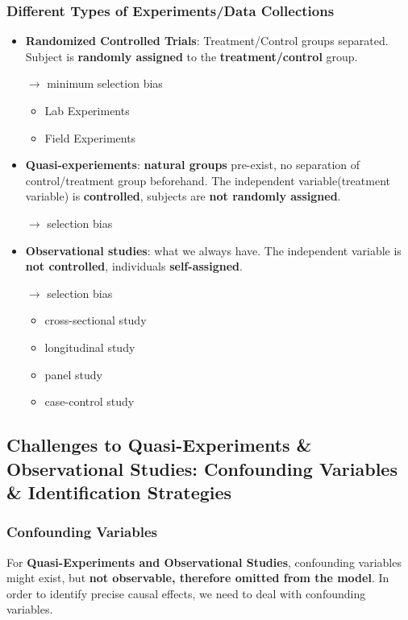 \subsubsection{Different Types of Experiments/Data Collections}
\begin{itemize}
	\item \textbf{Randomized Controlled Trials}: Treatment/Control groups separated. Subject is \textbf{randomly assigned} to the \textbf{treatment/control} group.
	
	$\rightarrow$ minimum selection bias
	\begin{itemize}
		\item Lab Experiments
		\item Field Experiments
	\end{itemize}
	
	\item \textbf{Quasi-experiements}: \textbf{natural groups} pre-exist, no separation of control/treatment group beforehand. The independent variable(treatment variable) is \textbf{controlled}, subjects are \textbf{not randomly assigned}.
	
	$\rightarrow$ selection bias
	
	\item \textbf{Observational studies}: what we always have. The independent variable is \textbf{not controlled}, individuals \textbf{self-assigned}.
	
	$\rightarrow$ selection bias 
	\begin{itemize}
		\item cross-sectional study
		\item longitudinal study
		\item panel study
		\item case-control study
	\end{itemize}
\end{itemize}

\subsection{Challenges to Quasi-Experiments \& Observational Studies: Confounding Variables \& Identification Strategies}
\subsubsection{Confounding Variables}

 For \textbf{Quasi-Experiments and Observational Studies}, confounding variables might exist, but \textbf{not observable, therefore omitted from the model}. In order to identify precise causal effects, we need to deal with confounding variables.



